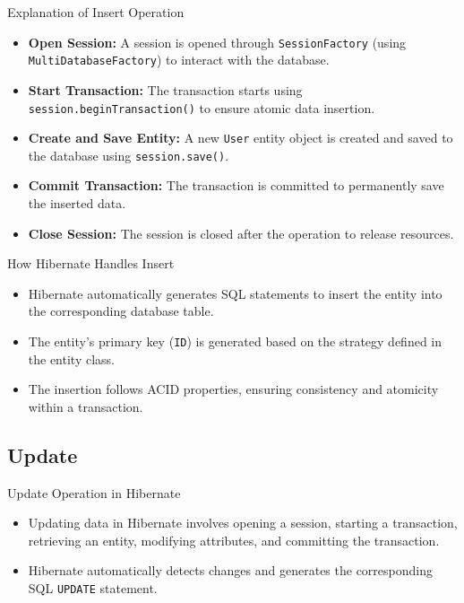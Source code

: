 \documentclass[aspectratio=169, table]{beamer}
\begin{document}
\begin{frame}{Explanation of Insert Operation}
	\vspace{20pt}
	\begin{itemize}
		\item \textbf{Open Session:} A session is opened through \texttt{SessionFactory} (using \texttt{MultiDatabaseFactory}) to interact with the database.
		\item \textbf{Start Transaction:} The transaction starts using \texttt{session.beginTransaction()} to ensure atomic data insertion.
		\item \textbf{Create and Save Entity:} A new \texttt{User} entity object is created and saved to the database using \texttt{session.save()}.
		\item \textbf{Commit Transaction:} The transaction is committed to permanently save the inserted data.
		\item \textbf{Close Session:} The session is closed after the operation to release resources.
	\end{itemize}
\end{frame}

\begin{frame}{How Hibernate Handles Insert}
	\vspace{20pt}
	\begin{itemize}
		\item Hibernate automatically generates SQL statements to insert the entity into the corresponding database table.
		\item The entity's primary key (\texttt{ID}) is generated based on the strategy defined in the entity class.
		\item The insertion follows ACID properties, ensuring consistency and atomicity within a transaction.
	\end{itemize}
\end{frame}

\subsection{Update}

\begin{frame}{Update Operation in Hibernate}
	\vspace{20pt}
	\begin{itemize}
		\item Updating data in Hibernate involves opening a session, starting a transaction, retrieving an entity, modifying attributes, and committing the transaction.
		\item Hibernate automatically detects changes and generates the corresponding SQL \texttt{UPDATE} statement.
	\end{itemize}
\end{frame}
\end{document}
